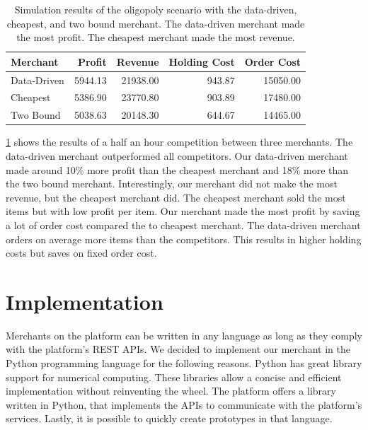 \begin{table}[t]
	\centering
	\begin{tabular}{lrrrr}
		\toprule
		Merchant & Profit & Revenue & Holding Cost & Order Cost \\
		\midrule
		Data-Driven & 5944.13 & 21938.00 & 943.87 & 15050.00 \\
		Cheapest & 5386.90 & 23770.80 & 903.89 & 17480.00 \\
		Two Bound & 5038.63 & 20148.30 & 644.67 & 14465.00 \\
		\bottomrule
	\end{tabular}
	\caption{Simulation results of the oligopoly scenario with the data-driven, cheapest, and two bound merchant. The data-driven merchant made the most profit. The cheapest merchant made the most revenue.}
	\label{tab:competition}
\end{table}

\cref{tab:competition} shows the results of a half an hour competition between three merchants.
The data-driven merchant outperformed all competitors.
Our data-driven merchant made around 10\% more profit than the cheapest merchant and 18\% more than the two bound merchant.
Interestingly, our merchant did not make the most revenue, but the cheapest merchant did.
The cheapest merchant sold the most items but with low profit per item.
Our merchant made the most profit by saving a lot of order cost compared the to cheapest merchant.
The data-driven merchant orders on average more items than the competitors.
This results in higher holding costs but saves on fixed order cost.


%

\section{Implementation}
Merchants on the \pricewars platform can be written in any language as long as they comply with the platform's REST APIs.
We decided to implement our merchant in the Python programming language for the following reasons.
Python has great library support for numerical computing.
These libraries allow a concise and efficient implementation without reinventing the wheel.
The \pricewars platform offers a library written in Python, that implements the APIs to communicate with the platform's services.
Lastly, it is possible to quickly create prototypes in that language.

